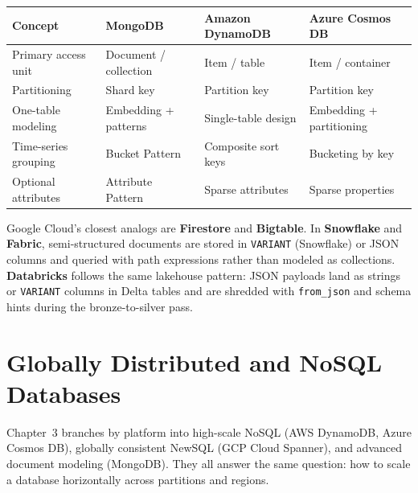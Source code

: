 \begin{center}
\footnotesize
\begin{tabular}{@{}p{3.0cm}p{3.2cm}p{3.2cm}p{3.0cm}@{}}
\toprule
\textbf{Concept} & \textbf{MongoDB} & \textbf{Amazon DynamoDB} & \textbf{Azure Cosmos DB} \\
\midrule
Primary access unit & Document / collection & Item / table & Item / container \\
Partitioning & Shard key & Partition key & Partition key \\
One-table modeling & Embedding + patterns & Single-table design & Embedding + partitioning \\
Time-series grouping & Bucket Pattern & Composite sort keys & Bucketing by key \\
Optional attributes & Attribute Pattern & Sparse attributes & Sparse properties \\
\bottomrule
\end{tabular}
\end{center}

\noindent Google Cloud's closest analogs are \textbf{Firestore} and \textbf{Bigtable}. In
\textbf{Snowflake} and \textbf{Fabric}, semi-structured documents are stored in \texttt{VARIANT}
(Snowflake) or JSON columns and queried with path expressions rather than modeled as collections.
\textbf{Databricks} follows the same lakehouse pattern: JSON payloads land as strings or
\texttt{VARIANT} columns in Delta tables and are shredded with \texttt{from\_json} and schema
hints during the bronze-to-silver pass.

\section{Globally Distributed and NoSQL Databases}
%
Chapter~3 branches by platform into high-scale NoSQL (AWS DynamoDB, Azure Cosmos DB), globally
consistent NewSQL (GCP Cloud Spanner), and advanced document modeling (MongoDB). They all answer
the same question: how to scale a database horizontally across partitions and regions.

